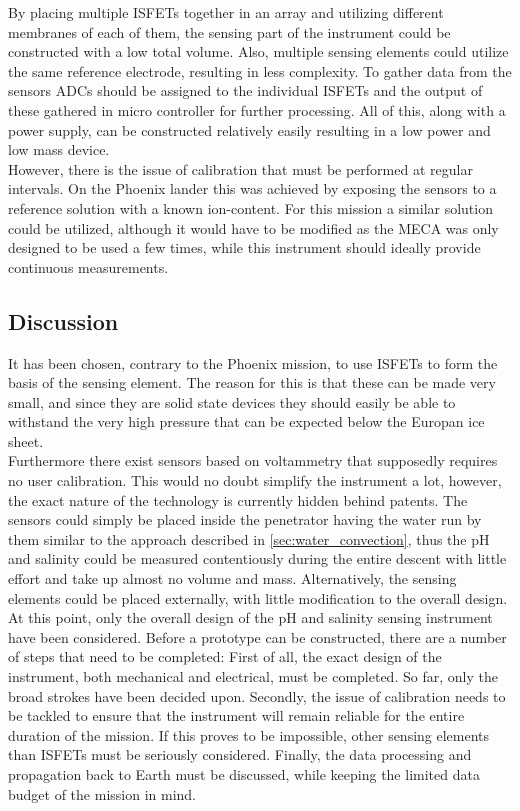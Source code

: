 \noindent
By placing multiple ISFETs together in an array and utilizing different membranes of each of them, the sensing part of the instrument could be constructed with a low total volume. Also, multiple sensing elements could utilize the same reference electrode, resulting in less complexity. To gather data from the sensors ADCs should be assigned to the individual ISFETs and the output of these gathered in micro controller for further processing. All of this, along with a power supply, can be constructed relatively easily resulting in a low power and low mass device. \\

\noindent
However, there is the issue of calibration that must be performed at regular intervals. On the Phoenix lander this was achieved by exposing the sensors to a reference solution with a known ion-content\cite{article:jgre2487}. For this mission a similar solution could be utilized, although it would have to be modified as the MECA was only designed to be used a few times, while this instrument should ideally provide continuous measurements.  

\subsection{Discussion}

It has been chosen, contrary to the Phoenix mission, to use ISFETs to form the basis of the sensing element. The reason for this is that these can be made very small, and since they are solid state devices they should easily be able to withstand the very high pressure that can be expected below the Europan ice sheet.\\

\noindent
Furthermore there exist sensors based on voltammetry that supposedly requires no user calibration\cite{website:senova}. This would no doubt simplify the instrument a lot, however, the exact nature of the technology is currently hidden behind patents. The sensors could simply be placed inside the penetrator having the water run by them similar to the approach described in \ref{sec:water_convection}, thus the pH and salinity could be measured contentiously during the entire descent with little effort and take up almost no volume and mass. Alternatively, the sensing elements could be placed externally, with little modification to the overall design.\\

\noindent
At this point, only the overall design of the pH and salinity sensing instrument have been considered. Before a prototype can be constructed, there are a number of steps that need to be completed:
First of all, the exact design of the instrument, both mechanical and electrical, must be completed. So far, only the broad strokes have been decided upon. Secondly, the issue of calibration needs to be tackled to ensure that the instrument will remain reliable for the entire duration of the mission. If this proves to be impossible, other sensing elements than ISFETs must be seriously considered. Finally, the data processing and propagation back to Earth must be discussed, while keeping the limited data budget of the mission in mind.
